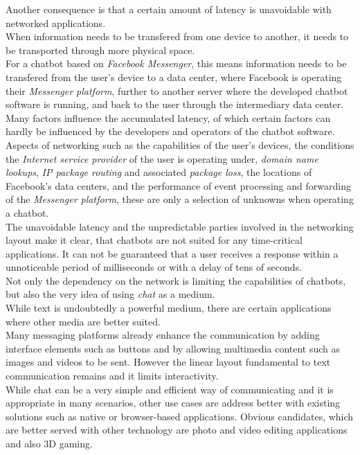 Another consequence is that a certain amount of latency is unavoidable with networked applications.
\\
When information needs to be transfered from one device to another,
it needs to be transported through more physical space.
\\
For a chatbot based on \emph{Facebook Messenger},
this means information needs to be transfered from the user's device to a data center,
where Facebook is operating their \emph{Messenger platform},
further to another server where the developed chatbot software is running,
and back to the user through the intermediary data center.
\\
Many factors influence the accumulated latency,
of which certain factors can hardly be influenced by the developers and operators of the chatbot software.
\\
Aspects of networking such as the capabilities of the user's devices,
the conditions the \emph{Internet service provider} of the user is operating under,
\emph{domain name lookups},
\emph{IP package routing} and associated \emph{package loss},
the locations of Facebook's data centers,
and the performance of event processing and forwarding of the \emph{Messenger platform},
these are only a selection of unknowns when operating a chatbot.
\\
The unavoidable latency and the unpredictable parties involved in the networking layout
make it clear, that chatbots are not suited for any time-critical applications.
It can not be guaranteed that a user receives a response within a unnoticeable period of milliseconds or with a delay of tens of seconds.
\\

Not only the dependency on the network is limiting the capabilities of chatbots,
but also the very idea of using \emph{chat} as a medium.
\\
While text is undoubtedly a powerful medium,
there are certain applications where other media are better suited.
\\
Many messaging platforms already enhance the communication by adding interface elements such as buttons
and by allowing multimedia content such as images and videos to be sent.
However the linear layout fundamental to text communication remains and it limits interactivity.
\\
While chat can be a very simple and efficient way of communicating and it is appropriate in many scenarios,
other use cases are address better with existing solutions such as native or browser-based applications.
Obvious candidates, which are better served with other technology are photo and video editing applications
and also 3D gaming.
\\


